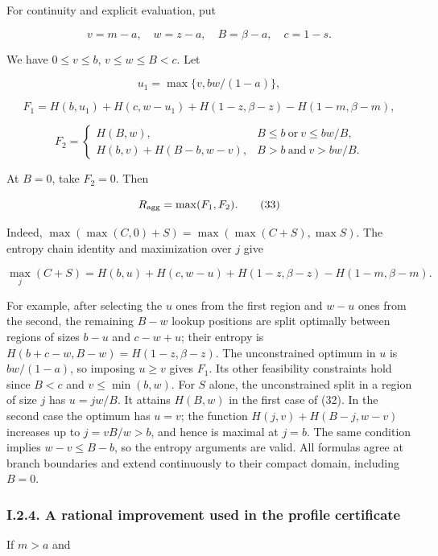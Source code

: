 For continuity and explicit evaluation, put

\[
v=m-a,\quad w=z-a,\quad B=\beta-a,\quad c=1-s.
\]

We have \(0\le v\le b\), \(v\le w\le B<c\). Let

\[
u_1=\max\{v,bw/(1-a)\},
\]

\[
F_1=H(b,u_1)+H(c,w-u_1)+H(1-z,\beta-z)
                         -H(1-m,\beta-m),
\]

\[
F_2=\begin{cases}
 H(B,w),&B\le b\ \text{or}\ v\le bw/B,\\
 H(b,v)+H(B-b,w-v),&B>b\ \text{and}\ v>bw/B.
\end{cases}
\tag{32}
\]

At \(B=0\), take \(F_2=0\). Then

\[
R_{\rm agg}=\max(F_1,F_2).
\tag{33}
\]

Indeed, \(\max(\max(C,0)+S)=\max(\max(C+S),\max S)\). The entropy chain identity and maximization over \(j\) give

\[
\max_j(C+S)=H(b,u)+H(c,w-u)+H(1-z,\beta-z)
                            -H(1-m,\beta-m).
\]

For example, after selecting the \(u\) ones from the first region and \(w-u\) ones from the second, the remaining \(B-w\) lookup positions are split optimally between regions of sizes \(b-u\) and \(c-w+u\); their entropy is \(H(b+c-w,B-w)=H(1-z,\beta-z)\). The unconstrained optimum in \(u\) is \(bw/(1-a)\), so imposing \(u\ge v\) gives \(F_1\). Its other feasibility constraints hold since \(B<c\) and \(v\le\min(b,w)\). For \(S\) alone, the unconstrained split in a region of size \(j\) has \(u=jw/B\). It attains \(H(B,w)\) in the first case of (32). In the second case the optimum has \(u=v\); the function \(H(j,v)+H(B-j,w-v)\) increases up to \(j=vB/w>b\), and hence is maximal at \(j=b\). The same condition implies \(w-v\le B-b\), so the entropy arguments are valid. All formulas agree at branch boundaries and extend continuously to their compact domain, including \(B=0\).

\hypertarget{af-a9ec399514-i.2.4.-a-rational-improvement-used-in-the-profile-certificate}{%
\subsubsection{I.2.4. A rational improvement used in the profile certificate}\label{af-a9ec399514-i.2.4.-a-rational-improvement-used-in-the-profile-certificate}}

If \(m>a\) and

